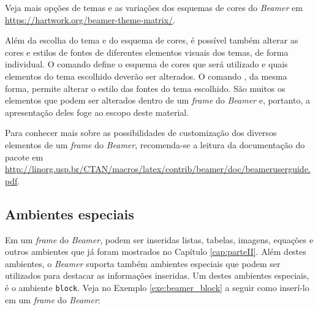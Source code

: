 \begin{marker}
Veja mais opções de temas e as variações dos esquemas de cores do \textit{Beamer} em \url{https://hartwork.org/beamer-theme-matrix/}.
\end{marker}

Além da escolha do tema e do esquema de cores, é possível também alterar as cores e estilos de fontes de diferentes elementos visuais dos temas, de forma individual. O comando \texttt{} define o esquema de cores que será utilizado e quais elementos do tema escolhido deverão ser alterados. O comando \texttt{}, da mesma forma, permite alterar o estilo das fontes do tema escolhido. São muitos os elementos que podem ser alterados dentro de um \textit{frame} do \textit{Beamer} e, portanto, a apresentação deles foge ao escopo deste material.

\begin{marker}
Para conhecer mais sobre as possibilidades de customização dos diversos elementos de um \textit{frame} do \textit{Beamer}, recomenda-se a leitura da documentação do pacote em \url{http://linorg.usp.br/CTAN/macros/latex/contrib/beamer/doc/beameruserguide.pdf}.
\end{marker}

\subsection{Ambientes especiais}
\label{sec:estrut_slide}

Em um \textit{frame} do \textit{Beamer}, podem ser inseridas listas, tabelas, imagens, equações e outros ambientes que já foram mostrados no Capítulo \ref{cap:parteII}. Além destes ambientes, o \textit{Beamer} suporta também ambientes especiais que podem ser utilizados para destacar as informações inseridas. Um destes ambientes especiais, é o ambiente \texttt{block}. Veja no Exemplo \ref{exe:beamer_block} a seguir como inserí-lo em um \textit{frame} do \textit{Beamer}:

